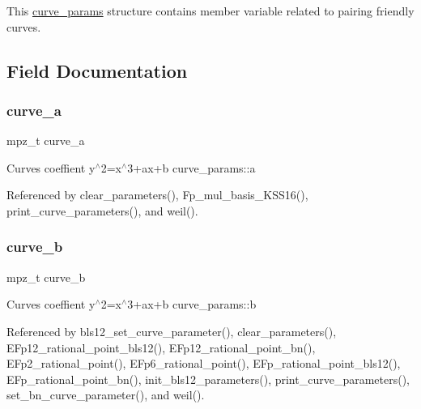 This \hyperlink{structcurve__params}{curve\+\_\+params} structure contains member variable related to pairing friendly curves. 

\subsection{Field Documentation}
\mbox{\label{structcurve__params_a76692630dc7e9637262e95fe0189cd9d}} 
\subsubsection{\texorpdfstring{curve\+\_\+a}{curve\_a}}
{\footnotesize\ttfamily mpz\+\_\+t curve\+\_\+a}

Curves coeffient y$^\wedge$2=x$^\wedge$3+ax+b curve\+\_\+params\+::a 

Referenced by clear\+\_\+parameters(), Fp\+\_\+mul\+\_\+basis\+\_\+\+K\+S\+S16(), print\+\_\+curve\+\_\+parameters(), and weil().

\mbox{\label{structcurve__params_a69f572611e84fdb672a5042ddc78bb84}} 
\subsubsection{\texorpdfstring{curve\+\_\+b}{curve\_b}}
{\footnotesize\ttfamily mpz\+\_\+t curve\+\_\+b}

Curves coeffient y$^\wedge$2=x$^\wedge$3+ax+b curve\+\_\+params\+::b 

Referenced by bls12\+\_\+set\+\_\+curve\+\_\+parameter(), clear\+\_\+parameters(), E\+Fp12\+\_\+rational\+\_\+point\+\_\+bls12(), E\+Fp12\+\_\+rational\+\_\+point\+\_\+bn(), E\+Fp2\+\_\+rational\+\_\+point(), E\+Fp6\+\_\+rational\+\_\+point(), E\+Fp\+\_\+rational\+\_\+point\+\_\+bls12(), E\+Fp\+\_\+rational\+\_\+point\+\_\+bn(), init\+\_\+bls12\+\_\+parameters(), print\+\_\+curve\+\_\+parameters(), set\+\_\+bn\+\_\+curve\+\_\+parameter(), and weil().

\mbox{\label{structcurve__params_a0bd24fe1a201e15d394f94b54fffed73}} 
